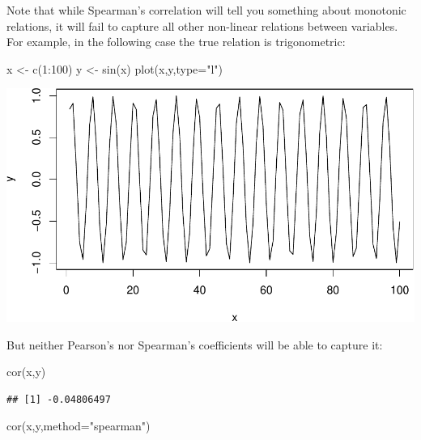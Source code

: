 \documentclass[
]{book}
\newenvironment{Shaded}{\begin{snugshade}}{\end{snugshade}}
\newcommand{\AttributeTok}[1]{\textcolor[rgb]{0.77,0.63,0.00}{#1}}
\newcommand{\DecValTok}[1]{\textcolor[rgb]{0.00,0.00,0.81}{#1}}
\newcommand{\FunctionTok}[1]{\textcolor[rgb]{0.00,0.00,0.00}{#1}}
\newcommand{\NormalTok}[1]{#1}
\newcommand{\OtherTok}[1]{\textcolor[rgb]{0.56,0.35,0.01}{#1}}
\newcommand{\SpecialCharTok}[1]{\textcolor[rgb]{0.00,0.00,0.00}{#1}}
\newcommand{\StringTok}[1]{\textcolor[rgb]{0.31,0.60,0.02}{#1}}
\theoremstyle{definition}
\theoremstyle{definition}
\theoremstyle{definition}
\theoremstyle{definition}
\theoremstyle{remark}
\begin{document}
Note that while Spearman's correlation will tell you something about monotonic relations, it will fail to capture all other non-linear relations between variables. For example, in the following case the true relation is trigonometric:

\begin{Shaded}
\begin{Highlighting}[]
\NormalTok{x }\OtherTok{\textless{}{-}} \FunctionTok{c}\NormalTok{(}\DecValTok{1}\SpecialCharTok{:}\DecValTok{100}\NormalTok{)}
\NormalTok{y }\OtherTok{\textless{}{-}} \FunctionTok{sin}\NormalTok{(x)}
\FunctionTok{plot}\NormalTok{(x,y,}\AttributeTok{type=}\StringTok{"l"}\NormalTok{)}
\end{Highlighting}
\end{Shaded}

\includegraphics{Svetunkov---Statistics-for-Business-Analytics_files/figure-latex/unnamed-chunk-52-1.pdf}

But neither Pearson's nor Spearman's coefficients will be able to capture it:

\begin{Shaded}
\begin{Highlighting}[]
\FunctionTok{cor}\NormalTok{(x,y)}
\end{Highlighting}
\end{Shaded}

\begin{verbatim}
## [1] -0.04806497
\end{verbatim}

\begin{Shaded}
\begin{Highlighting}[]
\FunctionTok{cor}\NormalTok{(x,y,}\AttributeTok{method=}\StringTok{"spearman"}\NormalTok{)}
\end{Highlighting}
\end{Shaded}
\end{document}
